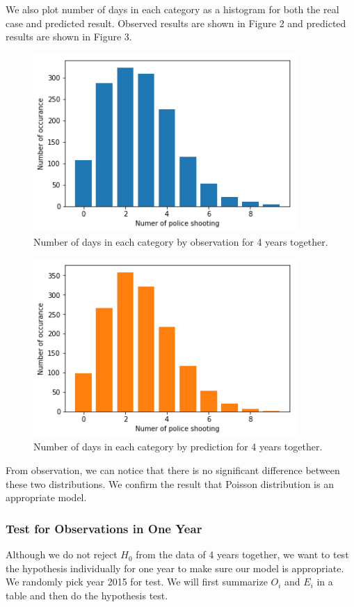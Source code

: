 \documentclass[11pt,a4paper,english]{article}
\begin{document}
We also plot number of days in each category as a histogram for both the real case and predicted result. Observed results are shown in Figure 2 and predicted results are shown in Figure 3.
\begin{figure}[htbp]
	\centering
	\includegraphics[width = 10cm]{4-years.png}
	\caption{Number of days in each category by observation for 4 years together.}
\end{figure}
\begin{figure}[htbp]
	\centering
	\includegraphics[width = 10cm]{poisson.png}
	\caption{Number of days in each category by prediction for 4 years together.}
\end{figure}

From observation, we can notice that there is no significant difference between these two distributions. We confirm the result that Poisson distribution is an appropriate model.
\subsubsection{Test for Observations in One Year}
Although we do not reject $H_{0}$ from the data of 4 years together, we want to test the hypothesis individually for one year to make sure our model is appropriate. We randomly pick year 2015 for test. We will first summarize $O_{i}$ and $E_{i}$ in a table and then do the hypothesis test.
\end{document}
